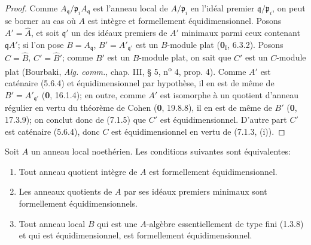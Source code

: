 \begin{proof}
Comme $A_{\mathfrak q}/\mathfrak p_iA_{\mathfrak q}$ est l'anneau local de
$A/\mathfrak p_i$ en l'idéal premier $\mathfrak q/\mathfrak p_i$, on peut
se borner au cas où $A$ est intègre et formellement équidimensionnel. Posons
$A'=\widehat A$, et soit $\mathfrak q'$ un des idéaux premiers de $A'$
minimaux parmi ceux contenant $\mathfrak qA'$; si l'on pose
$B=A_{\mathfrak q}$, $B'=A'_{\mathfrak q'}$ est un $B$-module plat
(\textbf{0}$_{\mathrm I}$, 6.3.2). Posons $C=\widehat B$, $C'=\widehat{B}'$; comme
$B'$ est un $B$-module plat, on sait que $C'$ est un $C$-module plat
(Bourbaki, \emph{Alg. comm.}, chap. III, § 5, n\textsuperscript{o} 4,
prop. 4). Comme $A'$ est caténaire (5.6.4) et équidimensionnel par
hypothèse, il en est de même de $B'=A'_{\mathfrak q'}$ (\textbf{0}, 16.1.4); en
outre, comme $A'$ est isomorphe à un quotient d'anneau régulier en vertu du
théorème de Cohen (\textbf{0}, 19.8.8), il en est de même de $B'$ (\textbf{0}, 17.3.9); on
conclut donc de (7.1.5) que $C'$ est équidimensionnel. D'autre part $C'$ est
caténaire (5.6.4), donc $C$ est équidimensionnel en vertu de (7.1.3, (i)).
\end{proof}

\begin{theorem}[7.1.8]
\label{IV.2.s7.1.8-fr}
Soit $A$ un anneau local noethérien. Les conditions suivantes sont
équivalentes:
\begin{enumerate}
\item[\textup{a)}] Tout anneau quotient intègre de $A$ est formellement équidimensionnel.
\item[\textup{b)}] Les anneaux quotients de $A$ par ses idéaux premiers minimaux sont
formellement équidimensionnels.
\item[\textup{c)}] Tout anneau local $B$ qui est une $A$-algèbre essentiellement de type
fini \textup{(1.3.8)} et qui est équidimensionnel, est formellement
équidimensionnel.
\end{enumerate}
\end{theorem}

